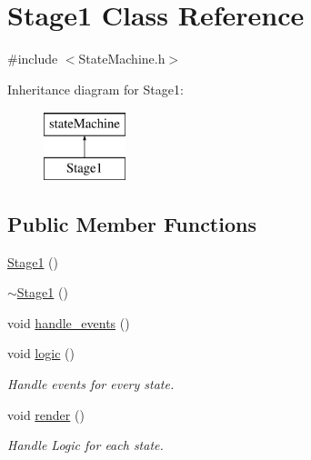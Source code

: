 \hypertarget{class_stage1}{\section{Stage1 Class Reference}
\label{class_stage1}
}


{\ttfamily \#include $<$State\-Machine.\-h$>$}

Inheritance diagram for Stage1\-:\begin{figure}[H]
\begin{center}
\leavevmode
\includegraphics[height=2.000000cm]{class_stage1}
\end{center}
\end{figure}
\subsection*{Public Member Functions}
\begin{DoxyCompactItemize}
\item 
\hyperlink{class_stage1_a18240000454d844b1c183a203eddbf4b}{Stage1} ()
\item 
\hyperlink{class_stage1_a0bd922af78678696112fe8d4091cfa4f}{$\sim$\-Stage1} ()
\item 
void \hyperlink{class_stage1_ae746fd19bf35b78535618cd5484d970c}{handle\-\_\-events} ()
\item 
void \hyperlink{class_stage1_ae7fe27770d40d654297f044e693af030}{logic} ()
\begin{DoxyCompactList}\small\item\em Handle events for every state. \end{DoxyCompactList}\item 
void \hyperlink{class_stage1_a60be0ff24305d7d018219f985b5b9323}{render} ()
\begin{DoxyCompactList}\small\item\em Handle Logic for each state. \end{DoxyCompactList}\end{DoxyCompactItemize}


